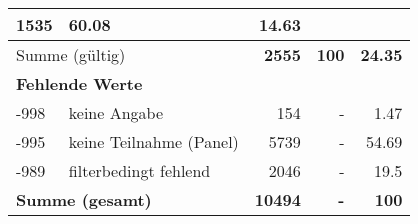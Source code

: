 \begin{longtable}{lXrrr}
       \num{1535} &
       \num[round-mode=places,round-precision=2]{60,08} &
         \num[round-mode=places,round-precision=2]{14,63} \\
     \midrule
     \multicolumn{2}{l}{Summe (gültig)} &
       \textbf{\num{2555}} &
     \textbf{100} &
       \textbf{\num[round-mode=places,round-precision=2]{24,35}} \\
     \multicolumn{5}{l}{\textbf{Fehlende Werte}}\\
       -998 &
       keine Angabe &
         \num{154} &
        - &
         \num[round-mode=places,round-precision=2]{1,47} \\
       -995 &
       keine Teilnahme (Panel) &
         \num{5739} &
        - &
         \num[round-mode=places,round-precision=2]{54,69} \\
       -989 &
       filterbedingt fehlend &
         \num{2046} &
        - &
         \num[round-mode=places,round-precision=2]{19,5} \\
     \midrule
     \multicolumn{2}{l}{\textbf{Summe (gesamt)}} &
          \textbf{\num{10494}} &
        \textbf{-} &
        \textbf{100} \\
     \bottomrule
     \end{longtable}
     

